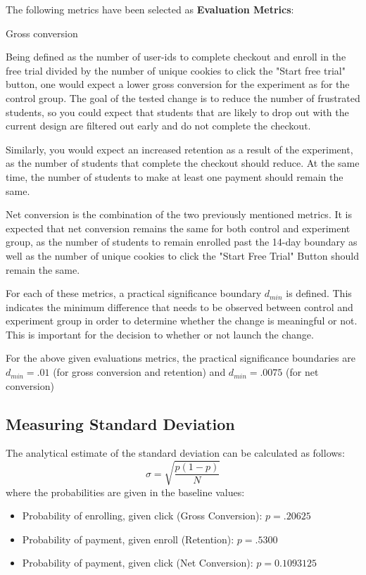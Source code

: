 \documentclass[11pt]{article} %
\begin{document}
\noindent The following metrics have been selected as \textbf{Evaluation Metrics}:
\begin{labeling}{Gross conversion}
\item [Gross conversion] Being defined as the number of user-ids to complete checkout and enroll in the free trial divided by the number of unique cookies to click the "Start free trial" button, one would expect a lower gross conversion for the experiment as for the control group. The goal of the tested change is to reduce the number of frustrated students, so you could expect that students that are likely to drop out with the current design are filtered out early and do not complete the checkout.
\item [Retention] Similarly, you would expect an increased retention as a result of the experiment, as the number of students that complete the checkout should reduce. At the same time, the number of students to make at least one payment should remain the same.
\item [Net conversion] Net conversion is the combination of the two previously mentioned metrics. It is expected that net conversion remains the same for both control and experiment group, as the number of students to remain enrolled past the 14-day boundary as well as the number of unique cookies to click the "Start Free Trial" Button should remain the same.
\end{labeling}
\noindent For each of these metrics, a practical significance boundary $d_{min}$ is defined. This indicates the minimum difference that needs to be observed between control and experiment group in order to determine whether the change is meaningful or not. This is important for the decision to whether or not launch the change.

For the above given evaluations metrics, the practical significance boundaries are $d_{min} = .01$ (for gross conversion and retention) and $d_{min} = .0075$ (for net conversion)

\subsection{Measuring Standard Deviation}

The analytical estimate of the standard deviation can be calculated as follows:
\begin{equation}
     \sigma = \sqrt{\frac{p(1-p)}{N}}
\end{equation}
\noindent where the probabilities are given in the baseline values:
\begin{itemize}
\item Probability of enrolling, given click (Gross Conversion): $p= .20625$
\item Probability of payment, given enroll (Retention): $p=.5300$
\item Probability of payment, given click (Net Conversion): $p=0.1093125$
\end{itemize}
\end{document}
